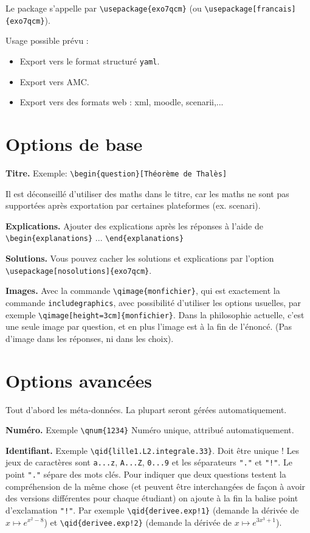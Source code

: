 \documentclass[12pt,a4paper]{article}
\begin{document}
Le package s'appelle par \verb|\usepackage{exo7qcm}| (ou \verb|\usepackage[francais]{exo7qcm}|).

Usage possible prévu  :
\begin{itemize}
  \item Export vers le format structuré \texttt{yaml}.
  \item Export vers AMC.
  \item Export vers des formats web : xml, moodle, scenarii,...
\end{itemize}

\section{Options de base}

\textbf{Titre.} Exemple: \verb|\begin{question}[Théorème de Thalès]|

Il est déconseillé d'utiliser des maths dans le titre, car les maths ne sont pas supportées après exportation par certaines plateformes (ex. scenari).


\bigskip
\textbf{Explications.} Ajouter des explications après les réponses à l'aide de
\verb|\begin{explanations}| ... \verb|\end{explanations}|

\bigskip
\textbf{Solutions.} Vous pouvez cacher les solutions et explications par l'option 
\verb|\usepackage[nosolutions]{exo7qcm}|. 

\bigskip
\textbf{Images.} Avec la commande \verb|\qimage{monfichier}|, qui est exactement la commande \verb|includegraphics|, avec possibilité d'utiliser les options usuelles, par exemple \verb|\qimage[height=3cm]{monfichier}|.
Dans la philosophie actuelle, c'est une seule image par question, et en plus l'image est à la fin de l'énoncé. (Pas d'image dans les réponses, ni dans les choix).


\section{Options avancées}

Tout d'abord les méta-données. La plupart seront gérées automatiquement.

\bigskip
\textbf{Numéro.} Exemple \verb|\qnum{1234}| Numéro unique, attribué automatiquement.


\bigskip
\textbf{Identifiant.} Exemple \verb|\qid{lille1.L2.integrale.33}|. Doit être unique ! 
Les jeux de caractères sont \texttt{a...z}, \texttt{A...Z}, \texttt{0...9} et les séparateurs \texttt{"."} et \texttt{"!"}. Le point \texttt{"."} sépare des mots clés. 
Pour indiquer que deux questions testent la compréhension de la même chose (et peuvent être interchangées de façon à avoir des versions différentes pour chaque étudiant) on ajoute à la fin la balise point d'exclamation \texttt{"!"}.
Par exemple \verb|\qid{derivee.exp!1}| (demande la dérivée de $x \mapsto e^{x^2-8}$)
et \verb|\qid{derivee.exp!2}| (demande la dérivée de $x \mapsto e^{3x^3+1}$).
\end{document}
